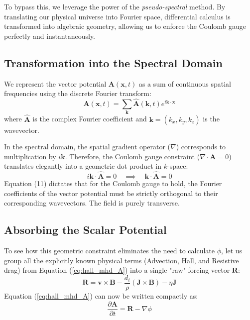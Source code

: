 \documentclass[11pt, a4paper]{article}
\begin{document}
To bypass this, we leverage the power of the \textit{pseudo-spectral} method. By translating our physical universe into Fourier space, differential calculus is transformed into algebraic geometry, allowing us to enforce the Coulomb gauge perfectly and instantaneously.

\subsection{Transformation into the Spectral Domain}
We represent the vector potential $\mathbf{A}(\mathbf{x}, t)$ as a sum of continuous spatial frequencies using the discrete Fourier transform:
\begin{equation}
    \mathbf{A}(\mathbf{x}, t) = \sum_{\mathbf{k}} \hat{\mathbf{A}}(\mathbf{k}, t) e^{i \mathbf{k} \cdot \mathbf{x}}
\end{equation}
where $\hat{\mathbf{A}}$ is the complex Fourier coefficient and $\mathbf{k} = (k_x, k_y, k_z)$ is the wavevector. 

In the spectral domain, the spatial gradient operator ($\nabla$) corresponds to multiplication by $i\mathbf{k}$. Therefore, the Coulomb gauge constraint ($\nabla \cdot \mathbf{A} = 0$) translates elegantly into a geometric dot product in $k$-space:
\begin{equation}
    i\mathbf{k} \cdot \hat{\mathbf{A}} = 0 \quad \implies \quad \mathbf{k} \cdot \hat{\mathbf{A}} = 0
\end{equation}
Equation (11) dictates that for the Coulomb gauge to hold, the Fourier coefficients of the vector potential must be strictly orthogonal to their corresponding wavevectors. The field is purely transverse.

\subsection{Absorbing the Scalar Potential}
To see how this geometric constraint eliminates the need to calculate $\phi$, let us group all the explicitly known physical terms (Advection, Hall, and Resistive drag) from Equation (\ref{eq:hall_mhd_A}) into a single "raw" forcing vector $\mathbf{R}$:
\begin{equation}
    \mathbf{R} = \mathbf{v} \times \mathbf{B} - \frac{d_i}{\rho} (\mathbf{J} \times \mathbf{B}) - \eta \mathbf{J}
\end{equation}
Equation (\ref{eq:hall_mhd_A}) can now be written compactly as:
\begin{equation}
    \frac{\partial \mathbf{A}}{\partial t} = \mathbf{R} - \nabla \phi
\end{equation}
\end{document}
